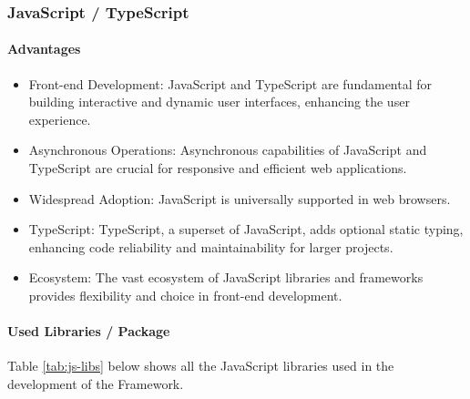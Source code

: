    \subsubsection{JavaScript / TypeScript}
        \paragraph{Advantages}
        \begin{itemize}
            \item Front-end Development: JavaScript and TypeScript are fundamental for building interactive and dynamic user interfaces, enhancing the user experience.
            \item Asynchronous Operations: Asynchronous capabilities of JavaScript and TypeScript are crucial for responsive and efficient web applications.
            \item Widespread Adoption: JavaScript is universally supported in web browsers.
            \item TypeScript: TypeScript, a superset of JavaScript, adds optional static typing, enhancing code reliability and maintainability for larger projects.
            \item Ecosystem: The vast ecosystem of JavaScript libraries and frameworks provides flexibility and choice in front-end development.
        \end{itemize}
        
        \paragraph{Used Libraries / Package}
        Table \ref{tab:js-libs} below shows all the JavaScript libraries used in the development of the Framework.
        
